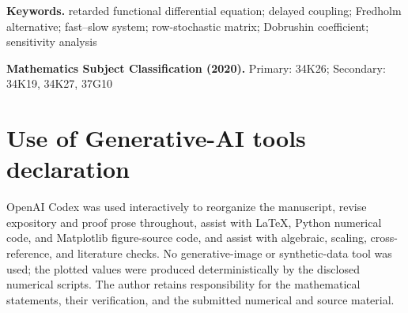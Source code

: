 \documentclass[11pt]{article}
\title{\papertitle}
\author{Haibo Lu\\
  \small Department of Management Science and Engineering,\\
  \small School of Economics and Management, Shanghai Institute of Technology,\\
  \small Shanghai, China\\
  \small Corresponding author:
  \href{mailto:luhaibo1985@gmail.com}{luhaibo1985@gmail.com}\\
  \small ORCID: \href{https://orcid.org/0009-0000-2717-5968}{0009-0000-2717-5968}}
\date{}
\begin{document}
\linenumbers
\maketitle

\begin{abstract}
We study the sensitivity of local fold matching in finite networks of
retarded functional differential equations.  Perturbations of the delayed
coupling preserve the sum of the coupling layers and are annihilated by the
stationary row at each delay.  The stationary projection of the vector field
is therefore unchanged at every history, although the projected variables
need not form a closed system.  For a polynomial fast--slow network, we
construct a two-dimensional locally invariant manifold of compatible
histories and a finite-interval matching function with parameter-derivative
bounds uniform in network size.  Its unique local zero satisfies
\(D_\eta\mu_N^{\rm fin}=\delta^3\Lambda_N+
O(\delta^4+\delta^3\|\eta\|)\).  The functional
\(\Lambda_N=\mathfrak r_NA_N^{-1}\mathsf S_N\) combines the first delay
moment, a transverse inverse, and the feedback from heterogeneous quadratic
coefficients.  Two distinct delays give a norm-optimal right inverse for the
unrestricted first-moment map; prescribed matrix patterns have an exact range
criterion.  Dobrushin contraction makes these bounds independent of network
size, and an explicit growing family has a nonzero uniform response.  A
separate conditional result transfers the coefficient to a heteroclinic
parameter when global invariant-manifold sections and the required comparison
with local matching are available.
\end{abstract}

\noindent\textbf{Keywords.}
retarded functional differential equation; delayed coupling;
Fredholm alternative; fast--slow system; row-stochastic matrix;
Dobrushin coefficient; sensitivity analysis

\medskip
\noindent\textbf{Mathematics Subject Classification (2020).}
Primary: 34K26; Secondary: 34K19, 34K27, 37G10





\clearpage



\section*{Use of Generative-AI tools declaration}
OpenAI Codex was used interactively to reorganize the manuscript, revise
expository and proof prose throughout, assist with \LaTeX{}, Python numerical
code, and Matplotlib figure-source code, and assist with algebraic, scaling,
cross-reference, and literature checks.  No generative-image or synthetic-data
tool was used; the plotted values were produced deterministically by the
disclosed numerical scripts.  The author retains responsibility for the mathematical statements, their
verification, and the submitted numerical and source material.
\end{document}
